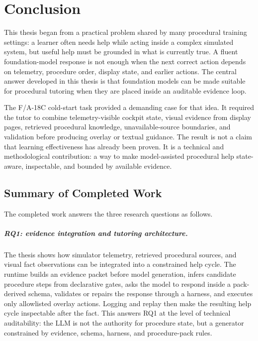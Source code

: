 %
\chapter{Conclusion}\label{ch:conclusion}

This thesis began from a practical problem shared by many procedural training
settings: a learner often needs help while acting inside a complex simulated
system, but useful help must be grounded in what is currently true. A fluent
foundation-model response is not enough when the next correct action depends on
telemetry, procedure order, display state, and earlier actions. The central
answer developed in this thesis is that foundation models can be made suitable
for procedural tutoring when they are placed inside an auditable evidence loop.

The F/A-18C cold-start task provided a demanding case for that idea. It required
the tutor to combine telemetry-visible cockpit state, visual evidence from
display pages, retrieved procedural knowledge, unavailable-source boundaries,
and validation before producing overlay or textual guidance. The result is not
a claim that learning effectiveness has already been proven. It is a technical
and methodological contribution: a way to make model-assisted procedural help
state-aware, inspectable, and bounded by available evidence.

\section{Summary of Completed Work}\label{sec:conc-summary}

The completed work answers the three research questions as follows.

\paragraph{RQ1: evidence integration and tutoring architecture.}
The thesis shows how simulator telemetry, retrieved procedural sources, and
visual fact observations can be integrated into a constrained help cycle. The
runtime builds an evidence packet before model generation, infers candidate
procedure steps from declarative gates, asks the model to respond inside a
pack-derived schema, validates or repairs the response through a harness, and
executes only allowlisted overlay actions. Logging and replay then make the
resulting help cycle inspectable after the fact. This answers RQ1 at the level
of technical auditability: the LLM is not the authority for procedure state, but
a generator constrained by evidence, schema, harness, and procedure-pack rules.

